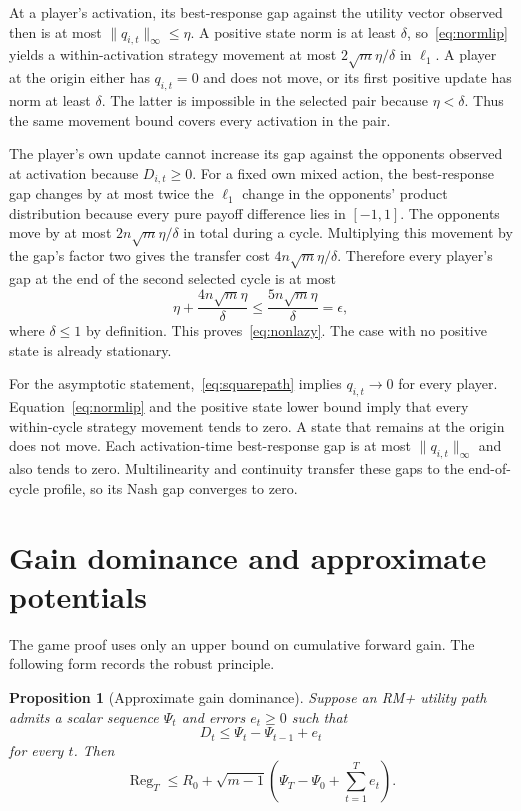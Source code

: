 \documentclass{article}
\newtheorem{proposition}[theorem]{Proposition}
\newcommand{\Reg}{\operatorname{Reg}}
\begin{document}
At a player's activation, its best-response gap against the utility vector observed then is at most $\|q_{i,t}\|_\infty\le\eta$. A positive state norm is at least $\delta$, so~\eqref{eq:normlip} yields a within-activation strategy movement at most $2\sqrt m\eta/\delta$ in $\ell_1$. A player at the origin either has $q_{i,t}=0$ and does not move, or its first positive update has norm at least $\delta$. The latter is impossible in the selected pair because $\eta<\delta$. Thus the same movement bound covers every activation in the pair.

The player's own update cannot increase its gap against the opponents observed at activation because $D_{i,t}\ge0$. For a fixed own mixed action, the best-response gap changes by at most twice the $\ell_1$ change in the opponents' product distribution because every pure payoff difference lies in $[-1,1]$. The opponents move by at most $2n\sqrt m\eta/\delta$ in total during a cycle. Multiplying this movement by the gap's factor two gives the transfer cost $4n\sqrt m\eta/\delta$. Therefore every player's gap at the end of the second selected cycle is at most
\begin{equation}
\eta+\frac{4n\sqrt m\eta}{\delta}
\le\frac{5n\sqrt m\eta}{\delta}=\epsilon,
\end{equation}
where $\delta\le1$ by definition. This proves~\eqref{eq:nonlazy}. The case with no positive state is already stationary.

For the asymptotic statement,~\eqref{eq:squarepath} implies $q_{i,t}\to0$ for every player. Equation~\eqref{eq:normlip} and the positive state lower bound imply that every within-cycle strategy movement tends to zero. A state that remains at the origin does not move. Each activation-time best-response gap is at most $\|q_{i,t}\|_\infty$ and also tends to zero. Multilinearity and continuity transfer these gaps to the end-of-cycle profile, so its Nash gap converges to zero.

\section{Gain dominance and approximate potentials}
\label{app:robust}

The game proof uses only an upper bound on cumulative forward gain. The following form records the robust principle.

\begin{proposition}[Approximate gain dominance]
\label{prop:robust}
Suppose an RM+ utility path admits a scalar sequence $\Psi_t$ and errors $e_t\ge0$ such that
\begin{equation}
D_t\le\Psi_t-\Psi_{t-1}+e_t
\end{equation}
for every $t$. Then
\begin{equation}
\Reg_T\le R_0+\sqrt{m-1}
\left(\Psi_T-\Psi_0+\sum_{t=1}^Te_t\right).
\end{equation}
\end{proposition}
\end{document}
